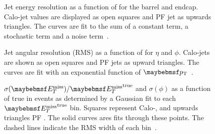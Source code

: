 \begin{figure}[htbp!]
\centering
{}\quad
{}\quad
\caption[Jet energy resolution as a function of \Pt]{Jet energy resolution as a
  function of \Pt for the  barrel and
   endcap. Calo-jet values are
  displayed as open squares and \ac{PF} jet as upwards triangles. The curves are
  fit to the sum of a constant term, a stochastic term and a noise term~\cite{cms_pf_pas}.}
\label{fig:reco_pf_jet_energyres}
\end{figure}

\begin{figure}[htbp!]
\centering
{}\quad
{}\quad
\caption[Jet angular resolution (\acs{RMS}) as a function of \Pt]{Jet angular
  resolution (\ac{RMS}) as a function of \Pt for 
  $\eta$ and  $\phi$. Calo-jets are shown as open
  squares and \ac{PF} jets as upward triangles. The curves are fit with an
  exponential function of $\Pt$~\cite{cms_pf_pas}.}
\label{fig:reco_pf_jet_angularres}
\end{figure}

\begin{figure}[htbp!]
\centering
{}\quad
{}\quad
\caption[\acl{PF} \MET energy and angular resolution in \ttbar events]{ $\sigma(\MET)/\MET^{\textrm{true}}$
  and  $\sigma(\phi)$ as a function of true \MET
  in \ttbar events as determined by a Gaussian fit to each
  $\MET^{\textrm{true}}$ bin. Squares represent Calo-\MET, and upwards triangles
  \ac{PF} \MET. The solid curves ares fits through these points. The dashed
  lines indicate the \ac{RMS} width of each bin~\cite{cms_pf_pas}.}
 \label{fig:reco_pf_met_res}
\end{figure}
